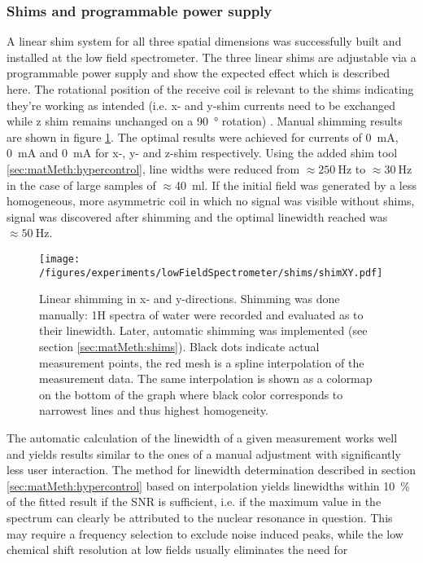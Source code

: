         \subsubsection{Shims and programmable power supply}
         A linear shim system for all three spatial dimensions was successfully built and installed at the low field spectrometer.
         The three linear shims are adjustable via a programmable power supply and show the expected effect which is described here. The rotational position of the receive coil is relevant to the shims indicating they're working as intended (i.e. x- and y-shim currents need to be exchanged while z shim remains unchanged on a \SI{90}{\degree} rotation) . Manual shimming results are shown in figure \ref{fig:results:lowFieldSpectrometer:shims}. The optimal results were achieved for currents of \SI{0}{\milli\ampere},  \SI{0}{\milli\ampere} and \SI{0}{\milli\ampere} for x-, y- and z-shim respectively. Using the added shim tool \ref{sec:matMeth:hypercontrol}, line widths were reduced from $\approx \SI{250}{\hertz}$ to $\approx \SI{30}{\hertz}$ in the case of large samples of $\approx $\SI{40}{\milli\litre}. If the initial field was generated by a less homogeneous, more asymmetric coil in which no signal was visible without shims, signal was discovered after shimming and the optimal linewidth reached was $\approx \SI{50}{\hertz}$.
            \begin{figure}
                \texttt{[image: /figures/experiments/lowFieldSpectrometer/shims/shimXY.pdf]}
                \caption[Manual low field shimming]{Linear shimming in x- and y-directions. Shimming was done manually: 1H spectra of water were recorded and evaluated as to their linewidth. Later, automatic shimming was implemented (see section \ref{sec:matMeth:shims}). Black dots indicate actual measurement points, the red mesh is a spline interpolation of the measurement data. The same interpolation is shown as a colormap on the bottom of the graph where black color corresponds to narrowest lines and thus highest homogeneity.}
                \label{fig:results:lowFieldSpectrometer:shims}
            \end{figure}
            The automatic calculation of the linewidth of a given measurement works well and yields results similar to the ones of a manual adjustment with significantly less user interaction. The method for linewidth determination described in section \ref{sec:matMeth:hypercontrol} based on interpolation yields linewidths within \SI{10}{\percent} of the fitted result if the SNR is sufficient, i.e. if the maximum value in the spectrum can clearly be attributed to the nuclear resonance in question. This may require a frequency selection to exclude noise induced peaks, while the low chemical shift resolution at low fields usually eliminates the need for 
